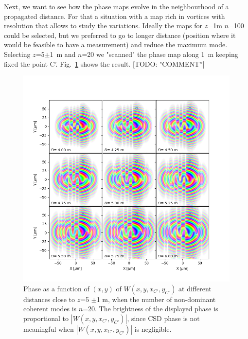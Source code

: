 \documentclass{iucr}              %
\newcommand{\todo}[1]{{\color{red}[TODO: "#1'']}}
\newcommand{\inblue}[1]{{\color{blue}#1}}
\begin{document}
Next, we want to see how the phase maps evolve in the neighbourhood of a propagated distance. For that a situation with a map rich in vortices with resolution that allows to study the variations. Ideally the maps for $z$=1m $n$=100 could be selected, but we preferred to go to longer distance (position where it would be feasible to have a measurement) and reduce the maximum mode. Selecting $z$=5$\pm$1~m and $n$=20 we "scanned" the phase map along 1~m keeping fixed the point C'. \inblue{Fig.~\ref{neighbour}} shows the result. \todo{COMMENT}


\begin{figure}\label{neighbour}%
\caption{Phase as a function of $(x,y)$ of $W(x,y,x_{C'},y_{C'})$ at different distances close to $z$=5 $\pm$1 m, when the number of non-dominant coherent modes is $n$=20. The brightness of the displayed phase is proportional to $|W(x,y,x_{C'},y_{C'})|$, since CSD phase is not meaningful when $|W(x,y,x_{C'},y_{C'})|$ is negligible.}
\includegraphics[width=1.1\textwidth]{Figures/vx_id16a_C5_propagated_neighbour_mode0019.png}

\end{figure}
\end{document}
